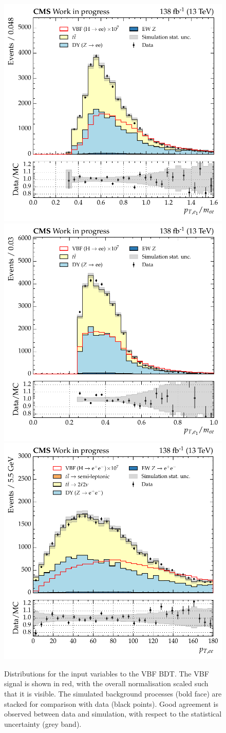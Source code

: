 \begin{figure}[htbp!]
\includegraphics[width =0.33\linewidth]{Figures/Hee/VBF/dataMC/all_inputs/VBF_BDT_leadElectronPtOvM.pdf}\hfill%
\includegraphics[width =0.33\linewidth]{Figures/Hee/VBF/dataMC/all_inputs/VBF_BDT_subleadElectronPtOvM.pdf}\hfill%
\includegraphics[width =0.33\linewidth]{Figures/Hee/VBF/dataMC/all_inputs/VBF_BDT_dielectronPt.pdf}\hfill%
\caption{Distributions for the input variables to the VBF BDT. The VBF signal is shown in red, with the overall normalisation scaled such that it is visible. The simulated background processes (bold face) are stacked for comparison with data (black points). Good agreement is observed between data and simulation, with respect to the statistical uncertainty (grey band).} 
\end{figure}
 
